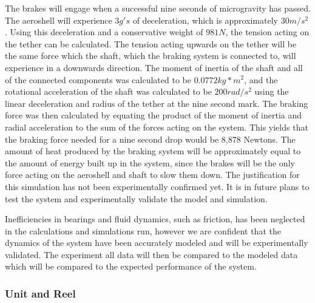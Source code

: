 The brakes will engage when a successful nine seconds of microgravity has passed. The aeroshell will experience $3 g's$ of deceleration, which is approximately $30 m/s^2$. Using this deceleration and a conservative weight of $981 N$, the tension acting on the tether can be calculated. The tension acting upwards on the tether will be the same force which the shaft, which the braking system is connected to, will experience in a downwards direction. The moment of inertia of the shaft and all of the connected components was calculated to be $0.0772 kg*m^2$, and the rotational acceleration of the shaft was calculated to be $200 rad/s^2$ using the linear deceleration and radius of the tether at the nine second mark. The braking force was then calculated by equating the product of the moment of inertia and radial acceleration to the sum of the forces acting on the system. This yields that the braking force needed for a nine second drop would be 8,878 Newtons. The amount of heat produced by the braking system will be approximately equal to the amount of energy built up in the system, since the brakes will be the only force acting on the aeroshell and shaft to slow them down. The justification for this simulation has not been experimentally confirmed yet. It is in future plans to test the system and experimentally validate the model and simulation.

Inefficiencies in bearings and fluid dynamics, such as friction, has been neglected in the calculations and simulations run, however we are confident that the dynamics of the system have been accurately modeled and will be experimentally validated. The experiment all data will then be compared to the modeled data which will be compared to the expected performance of the system.

\subsubsection{Unit and Reel} \label{UnitReelDesignAnalysis}

